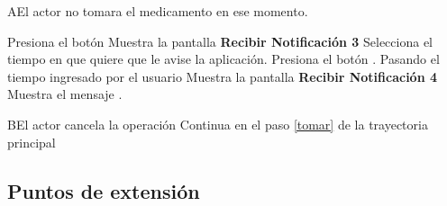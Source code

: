 \begin{UCtrayectoriaA}{A}{El actor no tomara el medicamento en ese momento.}
	
\UCpaso [\UCactor] Presiona el botón 
\UCpaso Muestra la pantalla \textbf{Recibir Notificación 3}
\UCpaso [\UCactor] Selecciona el tiempo en que quiere que le avise la aplicación.
\UCpaso [\UCactor] Presiona el botón . 
\UCpaso Pasando el tiempo ingresado por el usuario Muestra la pantalla \textbf{Recibir Notificación 4}
\UCpaso Muestra el mensaje .
\end{UCtrayectoriaA}

\begin{UCtrayectoriaA}{B}{El actor cancela la operación}
	\UCpaso Continua en el paso \ref{tomar} de la trayectoria principal
\end{UCtrayectoriaA}



\subsection{Puntos de extensión}
